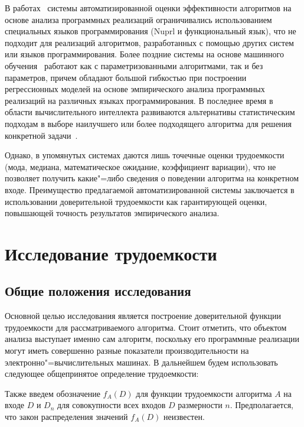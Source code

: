 \documentclass[a4paper, article, 14pt]{extarticle}
\begin{document}
В работах~\cite{functional_nuprl, functional_automation} системы автоматизированной оценки эффективности алгоритмов на основе анализа программных реализаций ограничивались использованием специальных языков программирования (Nuprl и функциональный язык), что не подходит для реализаций алгоритмов, разработанных с помощью других систем или языков программирования. Более поздние системы на основе машинного обучения~\cite{runtime_prediction} работают как с параметризованными алгоритмами, так и без параметров, причем обладают большой гибкостью при построении регрессионных моделей на основе эмпирического анализа программных реализаций на различных языках программирования. В последнее время в области вычислительного интеллекта развиваются альтернативы статистическим подходам в выборе наилучшего или более подходящего алгоритма для решения конкретной задачи~\cite{intelligence_forecasting}.

Однако, в упомянутых системах даются лишь точечные оценки трудоемкости (мода, медиана, математическое ожидание, коэффициент вариации), что не позволяет получить какие"=либо сведения о поведении алгоритма на конкретном входе. Преимущество предлагаемой автоматизированной системы заключается в использовании доверительной трудоемкости как гарантирующей оценки, повышающей точность результатов эмпирического анализа.

\section{Исследование трудоемкости}\label{sec:complexity_research}

\subsection{Общие положения исследования}\label{sec:common_definitions}

Основной целью исследования является построение доверительной функции трудоемкости для рассматриваемого алгоритма. Стоит отметить, что объектом анализа выступает именно сам алгоритм, поскольку его программные реализации могут иметь совершенно разные показатели производительности на электронно"=вычислительных машинах. В дальнейшем будем использовать следующее общепринятое определение трудоемкости:


Также введем обозначение $f_A(D)$ для функции трудоемкости алгоритма $A$ на входе $D$ и $D_n$ для совокупности всех входов $D$ размерности $n$. Предполагается, что закон распределения значений $f_A(D)$ неизвестен.
\end{document}
